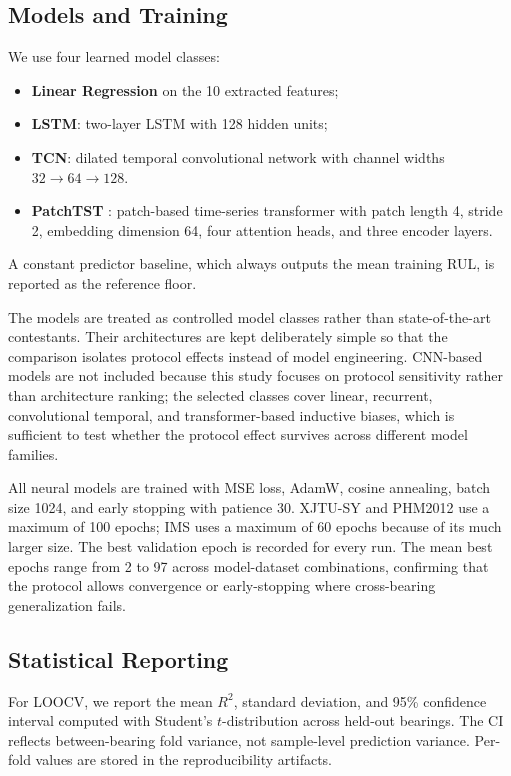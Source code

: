 \documentclass[pdflatex,sn-mathphys-num]{sn-jnl}
\begin{document}
\subsection{Models and Training}
We use four learned model classes:
\begin{itemize}
    \item \textbf{Linear Regression} on the 10 extracted features;
    \item \textbf{LSTM}: two-layer LSTM with 128 hidden units;
    \item \textbf{TCN}: dilated temporal convolutional network with channel widths $32 \to 64 \to 128$.
    \item \textbf{PatchTST} \cite{patchtst2023}: patch-based time-series transformer with patch length 4, stride 2, embedding dimension 64, four attention heads, and three encoder layers. \cite{vaswani2017attention}
\end{itemize}
A constant predictor baseline, which always outputs the mean training RUL, is reported as the reference floor.

The models are treated as controlled model classes rather than state-of-the-art contestants. Their architectures are kept deliberately simple so that the comparison isolates protocol effects instead of model engineering. CNN-based models are not included because this study focuses on protocol sensitivity rather than architecture ranking; the selected classes cover linear, recurrent, convolutional temporal, and transformer-based inductive biases, which is sufficient to test whether the protocol effect survives across different model families.

All neural models are trained with MSE loss, AdamW, cosine annealing, batch size 1024, and early stopping with patience 30. XJTU-SY and PHM2012 use a maximum of 100 epochs; IMS uses a maximum of 60 epochs because of its much larger size. The best validation epoch is recorded for every run. The mean best epochs range from 2 to 97 across model-dataset combinations, confirming that the protocol allows convergence or early-stopping where cross-bearing generalization fails.

\subsection{Statistical Reporting}
For LOOCV, we report the mean $R^2$, standard deviation, and 95\% confidence interval computed with Student's $t$-distribution across held-out bearings. The CI reflects between-bearing fold variance, not sample-level prediction variance. Per-fold values are stored in the reproducibility artifacts.
\end{document}
